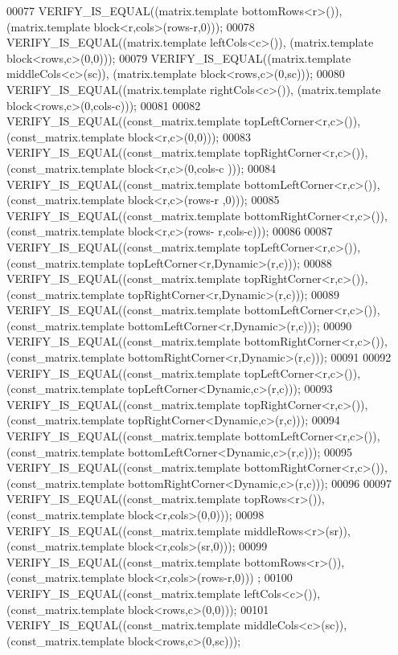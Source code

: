 \begin{DoxyCode}
00077   VERIFY\_IS\_EQUAL((matrix.template bottomRows<r>()), (matrix.template block<r,cols>(rows-r,0)));
00078   VERIFY\_IS\_EQUAL((matrix.template leftCols<c>()), (matrix.template block<rows,c>(0,0)));
00079   VERIFY\_IS\_EQUAL((matrix.template middleCols<c>(sc)), (matrix.template block<rows,c>(0,sc)));
00080   VERIFY\_IS\_EQUAL((matrix.template rightCols<c>()), (matrix.template block<rows,c>(0,cols-c)));
00081 
00082   VERIFY\_IS\_EQUAL((const\_matrix.template topLeftCorner<r,c>()), (const\_matrix.template block<r,c>(0,0)));
00083   VERIFY\_IS\_EQUAL((const\_matrix.template topRightCorner<r,c>()), (const\_matrix.template block<r,c>(0,cols-c
      )));
00084   VERIFY\_IS\_EQUAL((const\_matrix.template bottomLeftCorner<r,c>()), (const\_matrix.template block<r,c>(rows-r
      ,0)));
00085   VERIFY\_IS\_EQUAL((const\_matrix.template bottomRightCorner<r,c>()), (const\_matrix.template block<r,c>(rows-
      r,cols-c)));
00086 
00087   VERIFY\_IS\_EQUAL((const\_matrix.template topLeftCorner<r,c>()), (const\_matrix.template 
      topLeftCorner<r,Dynamic>(r,c)));
00088   VERIFY\_IS\_EQUAL((const\_matrix.template topRightCorner<r,c>()), (const\_matrix.template 
      topRightCorner<r,Dynamic>(r,c)));
00089   VERIFY\_IS\_EQUAL((const\_matrix.template bottomLeftCorner<r,c>()), (const\_matrix.template 
      bottomLeftCorner<r,Dynamic>(r,c)));
00090   VERIFY\_IS\_EQUAL((const\_matrix.template bottomRightCorner<r,c>()), (const\_matrix.template 
      bottomRightCorner<r,Dynamic>(r,c)));
00091 
00092   VERIFY\_IS\_EQUAL((const\_matrix.template topLeftCorner<r,c>()), (const\_matrix.template 
      topLeftCorner<Dynamic,c>(r,c)));
00093   VERIFY\_IS\_EQUAL((const\_matrix.template topRightCorner<r,c>()), (const\_matrix.template 
      topRightCorner<Dynamic,c>(r,c)));
00094   VERIFY\_IS\_EQUAL((const\_matrix.template bottomLeftCorner<r,c>()), (const\_matrix.template 
      bottomLeftCorner<Dynamic,c>(r,c)));
00095   VERIFY\_IS\_EQUAL((const\_matrix.template bottomRightCorner<r,c>()), (const\_matrix.template 
      bottomRightCorner<Dynamic,c>(r,c)));
00096 
00097   VERIFY\_IS\_EQUAL((const\_matrix.template topRows<r>()), (const\_matrix.template block<r,cols>(0,0)));
00098   VERIFY\_IS\_EQUAL((const\_matrix.template middleRows<r>(sr)), (const\_matrix.template block<r,cols>(sr,0)));
00099   VERIFY\_IS\_EQUAL((const\_matrix.template bottomRows<r>()), (const\_matrix.template block<r,cols>(rows-r,0)))
      ;
00100   VERIFY\_IS\_EQUAL((const\_matrix.template leftCols<c>()), (const\_matrix.template block<rows,c>(0,0)));
00101   VERIFY\_IS\_EQUAL((const\_matrix.template middleCols<c>(sc)), (const\_matrix.template block<rows,c>(0,sc)));

\end{DoxyCode}
